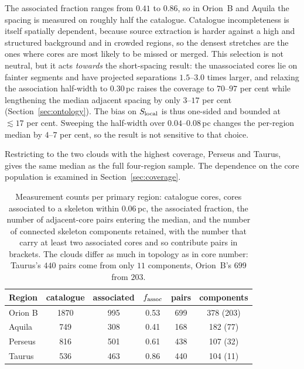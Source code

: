 \documentclass[usenatbib,twoside,twocolumn]{mnras}
\begin{document}
The associated fraction ranges from $0.41$ to $0.86$, so in Orion~B and Aquila the spacing is measured on roughly half the catalogue. Catalogue incompleteness is itself spatially dependent, because source extraction is harder against a high and structured background and in crowded regions, so the densest stretches are the ones where cores are most likely to be missed or merged. This selection is not neutral, but it acts \emph{towards} the short-spacing result: the unassociated cores lie on fainter segments and have projected separations $1.5$--$3.0$ times larger, and relaxing the association half-width to $0.30$\,pc raises the coverage to $70$--$97$ per cent while lengthening the median adjacent spacing by only $3$--$17$ per cent (Section~\ref{sec:ontology}). The bias on $S_{\rm local}$ is thus one-sided and bounded at $\lesssim17$ per cent. Sweeping the half-width over $0.04$--$0.08$\,pc changes the per-region median by $4$--$7$ per cent, so the result is not sensitive to that choice.

Restricting to the two clouds with the highest coverage, Perseus and Taurus, gives the same median as the full four-region sample. The dependence on the core population is examined in Section~\ref{sec:coverage}.



\begin{table}
\caption{Measurement counts per primary region: catalogue cores, cores associated to a skeleton within $0.06$\,pc, the associated fraction, the number of adjacent-core pairs entering the median, and the number of connected skeleton components retained, with the number that carry at least two associated cores and so contribute pairs in brackets. The clouds differ as much in topology as in core number: Taurus's $440$ pairs come from only $11$ components, Orion~B's $699$ from $203$.}
\label{tab:nnpipeline}
\footnotesize
\setlength{\tabcolsep}{5pt}
\begin{tabular}{lccccc}
\toprule
Region & catalogue & associated & $f_{\rm assoc}$ & pairs & components \\
\midrule
Orion B & 1870 & 995 & 0.53 & 699 & 378 (203) \\
Aquila  &  749 & 308 & 0.41 & 168 & 182 (77) \\
Perseus &  816 & 501 & 0.61 & 438 & 107 (32) \\
Taurus  &  536 & 463 & 0.86 & 440 & 104 (11) \\
\bottomrule
\end{tabular}
\end{table}
\end{document}
